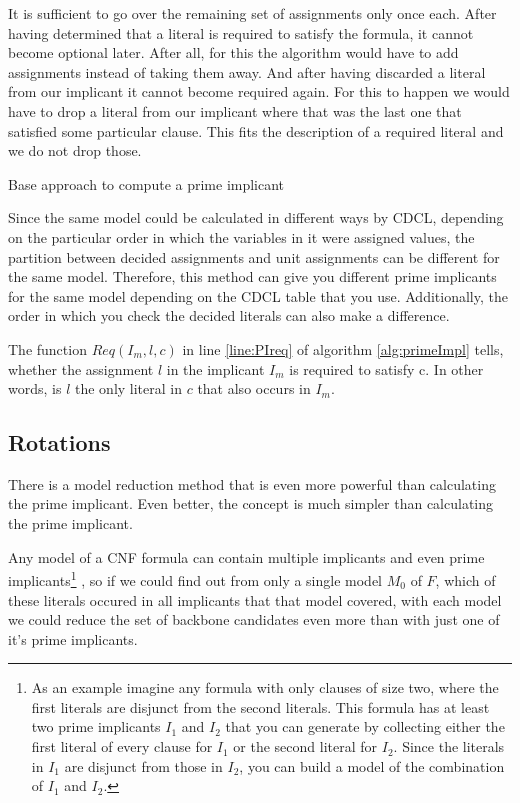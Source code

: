 It is sufficient to go over the remaining set of assignments only once each. After having determined that a literal is required to satisfy the formula, it cannot become optional later. After all, for this the algorithm would have to add assignments instead of taking them away. And after having discarded a literal from our implicant it cannot become required again. For this to happen we would have to drop a literal from our implicant where that was the last one that satisfied some particular clause. This fits the description of a required literal and we do not drop those.
\begin{algorithm}
\caption{{\sc Base approach to compute a prime implicant}}
\label{alg:primeImpl}
\DontPrintSemicolon
{}
\;
\end{algorithm}

Since the same model could be calculated in different ways by CDCL, depending on the particular order in which the variables in it were assigned values, the partition between decided assignments and unit assignments can be different for the same model. Therefore, this method can give you different prime implicants for the same model depending on the CDCL table that you use. Additionally, the order in which you check the decided literals can also make a difference. 

The function $Req(I_m,l,c)$ in line \ref{line:PIreq} of algorithm \ref{alg:primeImpl} tells, whether the assignment $l$ in the implicant $I_m$ is required to satisfy c. In other words, is $l$ the only literal in $c$ that also occurs in $I_m$.

\subsection{Rotations}
\label{ss:rot}
There is a model reduction method that is even more powerful than calculating the prime implicant. Even better, the concept is much simpler than calculating the prime implicant. 

Any model of a CNF formula can contain multiple implicants and even prime implicants\footnote
	{As an example imagine any formula with only clauses of size two, where the first literals are disjunct from the second literals. This formula has at least two prime implicants $I_1$ and $I_2$ that you can generate by collecting either the first literal of every clause for $I_1$ or the second literal for $I_2$. Since the literals in $I_1$ are disjunct from those in $I_2$, you can build a model of the combination of $I_1$ and $I_2$.}
, so if we could find out from only a single model $M_0$ of $F$, which of these literals occured in all implicants that that model covered, with each model we could reduce the set of backbone candidates even more than with just one of it's prime implicants.


